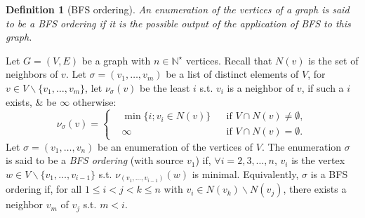 \documentclass[oneside]{book}
\newtheorem{definition}{Definition}
\begin{document}
\begin{definition}[BFS ordering]
	An enumeration of the vertices of a graph is said to be a {\rm BFS ordering} if it is the possible output of the application of BFS to this graph.
\end{definition}
Let $G = (V,E)$ be a graph with $n\in\mathbb{N}^\star$ vertices. Recall that $N(v)$ is the set of neighbors of $v$. Let $\sigma = (v_1,\ldots,v_m)$ be a list of distinct elements of $V$, for $v\in V\backslash\{v_1,\ldots,v_m\}$, let $\nu_\sigma(v)$ be the least $i$ s.t. $v_i$ is a neighbor of $v$, if such a $i$ exists, \& be $\infty$ otherwise:
\begin{equation*}
	\nu_\sigma(v) = \left\{\begin{split}
		&\min\{i;v_i\in N(v)\}&&\mbox{if } V\cap N(v)\ne\emptyset,\\
		&\infty&&\mbox{if } V\cap N(v) = \emptyset.
	\end{split}\right.
\end{equation*}
Let $\sigma = (v_1,\ldots,v_n)$ be an enumeration of the vertices of $V$. The enumeration $\sigma$ is said to be a {\it BFS ordering} (with source $v_1$) if, $\forall i = 2,3,\ldots,n$, $v_i$ is the vertex $w\in V\backslash\{v_1,\ldots,v_{i-1}\}$ s.t. $\nu_{(v_1,\ldots,v_{i-1})}(w)$ is minimal. Equivalently, $\sigma$ is a BFS ordering if, for all $1\le i < j < k\le n$ with $v_i\in N(v_k)\backslash N(v_j)$, there exists a neighbor $v_m$ of $v_j$ s.t. $m < i$.


\end{document}
